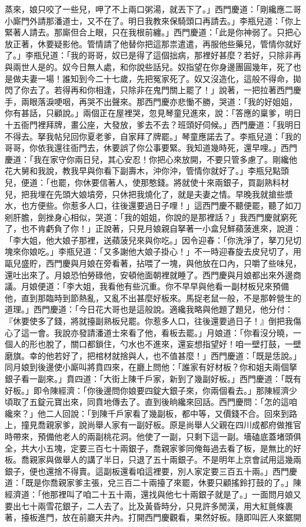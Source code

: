 蒸來，娘只咬了一些兒，呷了不上兩口粥湯，就丟下了。」西門慶道：「剛纔應二哥小廝門外請那潘道士，又不在了。明日我教來保騎頭口再請去。」李瓶兒道：「你上緊著人請去。那廝但合上眼，只在我根前纏。」西門慶道：「此是你神弱了。只把心放正著，休要疑影他。管情請了他替你把這那祟遣遣，再服他些藥兒，管情你就好了。」李瓶兒道：「我的哥哥，奴已是得了這個拙病，那裡好甚麼？若好，只除非再與兩世人是的。奴今日無人處，和你說些話兒。奴指望在你身邊團圓幾年，死了也是做夫妻一場！誰知到今二十七歲，先把冤家死了。奴又沒造化，這般不得命，拋閃了你去了。若得再和你相逢，只除非在鬼門關上罷了！」說著，一把拉著西門慶手，兩眼落淚哽咽，再哭不出聲來。那西門慶亦悲慟不勝，哭道：「我的好姐姐，你有甚話，只顧說。」兩個正在屋裡哭，忽見琴童兒進來，說：「答應的稟爹，明日十五衙門裡拜牌，畫公座，大發放，爹去不去？班頭好伺候。」西門慶道：「我明日不得去。拏我帖兒回你夏老爹，自家拜了牌罷。」琴童應諾去了。李瓶兒道：「我的哥哥，你依我還往衙門去，休要誤了你公事要緊。我知道幾時死，還早哩。」西門慶道：「我在家守你兩日兒，其心安忍！你把心來放開，不要只管多慮了。剛纔他花大舅和我說，教我早與你看下副壽木，沖你沖，管情你就好了。」李瓶兒點頭兒，便道：「也罷，你休要信著人，使那憨錢。將就使十來兩銀子，買副熟料材兒，把我埋在先頭大娘墳旁，只休把我燒化了，就是夫妻之情。早晚我就搶些漿水，也方便些。你惹多人口，往後還要過日子哩！」這西門慶不聽便罷，聽了如刀剜肝膽，劍挫身心相似，哭道：「我的姐姐，你說的是那裡話？」我西門慶就窮死了，也不肯虧負了你！」正說著，只見月娘親自拏著一小盒兒鮮蘋菠進來，說道：「李大姐，他大娘子那裡，送蘋菠兒來與你吃。」因令迎春：「你洗淨了，拏刀兒切塊來你娘吃。」李瓶兒道：「又多謝他大娘子掛心！」不一時迎春旋去皮兒切了，用甌兒盛貯，西門慶與月娘在旁看著，拈喂了一塊，與他放在口內，只嚼了些味兒，還吐出來了。月娘恐怕勞碌他，安頓他面朝裡就睡了。西門慶與月娘都出來外邊商議。月娘便道：「李大姐，我看他有些沉重。你不早早與他看一副材板兒來預備他，直到那臨時到節熱亂，又亂不出甚麼好板來。馬捉老鼠一般，不是那幹營生的道理。」西門慶道：「今日花大哥也是這般說。適纔我略與他題了題兒，他分付：『休要使多了錢，將就擡副熟板兒罷。你惹多人口，往後還要過日子！』倒把我傷心了這一會。我說亦發請潘道士來看了他，看板去罷。」月娘道：「你看沒分曉，一個人的形也脫了，關口都鎖住，勺水也不進來，還妄想指望好！咱一壁打鼓，一壁磨旗。幸的他若好了，把棺材就捨與人，也不值甚麼！」西門慶道：「既是恁說。」同月娘到後邊使小廝叫將賁四來，在廳上問他：「誰家有好材板？你和姐夫兩個拏銀子看一副來。」賁四道：「大街上陳千戶家，新到了幾副好板。」西門慶道：「既有好板。」即令陳經濟：「你後邊問你娘要四錠大銀子來，你兩個看去。」那陳經濟少頃取了五錠元寶出來，同賁地傳去了。直到後晌纔來回話。西門慶問：「怎的這咱纔來？」他二人回說：「到陳千戶家看了幾副板，都中等，又價錢不合。回來到路上，撞見喬親家爹，說尚舉人家有一副好板。原是尚舉人父親在四川成都府做推官時帶來，預備他老人的兩副桃花洞。他使了一副，只剩下這一副。墻磕底蓋堵頭俱全，共大小五塊，定要三百七十兩銀子，喬親家爹同俺每過去看了板，是無比的好板。喬親家與做舉人的講了半日，只退了五十兩銀子。不是明年上京會試用這幾兩銀子，便也還捨不得賣。這副板還看咱這裡要，別人家定要三百五十兩。」西門慶道：「既是你喬親家爹主張，兌三百二十兩擡了來罷，休要只顧搖鈴打鼓的了。」陳經濟道：「他那裡叫了咱二十五十兩，還找與他七十兩銀子就是了。」一面問月娘又要出七十兩雪花銀子，二人去了。比及黃昏時分，只見許多閒漢，用大紅氈條裹著，擡板進門，放在前廳天井內。打開西門慶觀看，果然好板。隨即叫匠人來鋸開